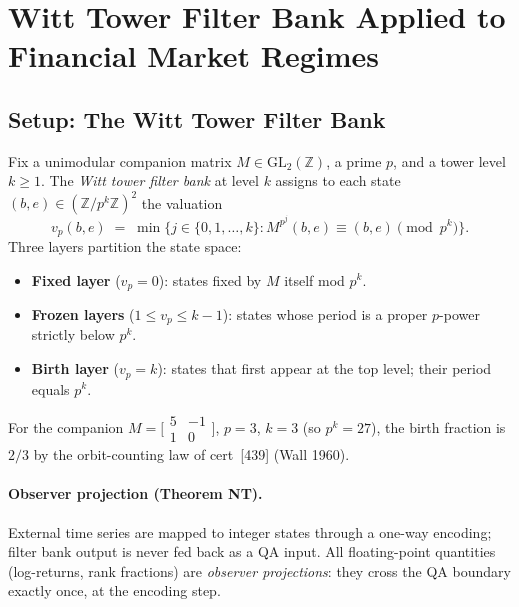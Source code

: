 \section{Witt Tower Filter Bank Applied to Financial Market Regimes}
\label{sec:witt-financial}

\subsection{Setup: The Witt Tower Filter Bank}
\label{sec:witt-filterbank}

Fix a unimodular companion matrix $M \in \mathrm{GL}_2(\mathbb{Z})$, a
prime $p$, and a tower level $k \geq 1$.  The \emph{Witt tower filter bank}
at level $k$ assigns to each state $(b, e) \in (\mathbb{Z}/p^k\mathbb{Z})^2$
the valuation
\[
  v_p(b, e) \;=\; \min\bigl\{j \in \{0,1,\ldots,k\} :
    M^{p^j}(b,e) \equiv (b,e) \pmod{p^k}\bigr\}.
\]
Three layers partition the state space:
\begin{itemize}
  \item \textbf{Fixed layer} ($v_p = 0$): states fixed by $M$ itself mod $p^k$.
  \item \textbf{Frozen layers} ($1 \leq v_p \leq k-1$): states whose period is
    a proper $p$-power strictly below $p^k$.
  \item \textbf{Birth layer} ($v_p = k$): states that first appear at the
    top level; their period equals $p^k$.
\end{itemize}
For the companion $M = \bigl[\begin{smallmatrix}5 & -1\\ 1 & 0
\end{smallmatrix}\bigr]$, $p = 3$, $k = 3$ (so $p^k = 27$), the
birth fraction is $2/3$ by the orbit-counting law of cert~[439]
(Wall 1960).

\paragraph{Observer projection (Theorem NT).}
External time series are mapped to integer states through a one-way
encoding; filter bank output is never fed back as a QA input.  All
floating-point quantities (log-returns, rank fractions) are
\emph{observer projections}: they cross the QA boundary exactly once,
at the encoding step.

